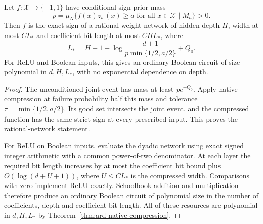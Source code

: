 \begin{corollary}
\label{cor:ard-margin-converse}
Let $f:\mathcal X\to\{-1,1\}$ have conditional sign prior mass
\[
 p=\mu_N\{f(x)z_w(x)\ge a\text{ for all }x\in\mathcal X\mid M_a\}>0.
\]
Then $f$ is the exact sign of a rational-weight network of hidden depth $H$, width at most $CL_*$ and coefficient bit length at most $CHL_*$, where
\[
 L_*=H+1+\log\frac{d+1}{p\min\{1/2,a/2\}}+Q_0.
\]
For ReLU and Boolean inputs, this gives an ordinary Boolean circuit of size polynomial in $d,H,L_*$, with no exponential dependence on depth.
\end{corollary}
\begin{proof}
The unconditioned joint event has mass at least $p e^{-Q_0}$. Apply native compression at failure probability half this mass and tolerance $\tau=\min\{1/2,a/2\}$. Its good set intersects the joint event, and the compressed function has the same strict sign at every prescribed input. This proves the rational-network statement.

For ReLU on Boolean inputs, evaluate the dyadic network using exact signed integer arithmetic with a common power-of-two denominator. At each layer the required bit length increases by at most the coefficient bit bound plus $O(\log(d+U+1))$, where $U\le CL_*$ is the compressed width. Comparisons with zero implement ReLU exactly. Schoolbook addition and multiplication therefore produce an ordinary Boolean circuit of polynomial size in the number of coefficients, depth and coefficient bit length. All of these resources are polynomial in $d,H,L_*$ by Theorem~\ref{thm:ard-native-compression}.
\end{proof}

